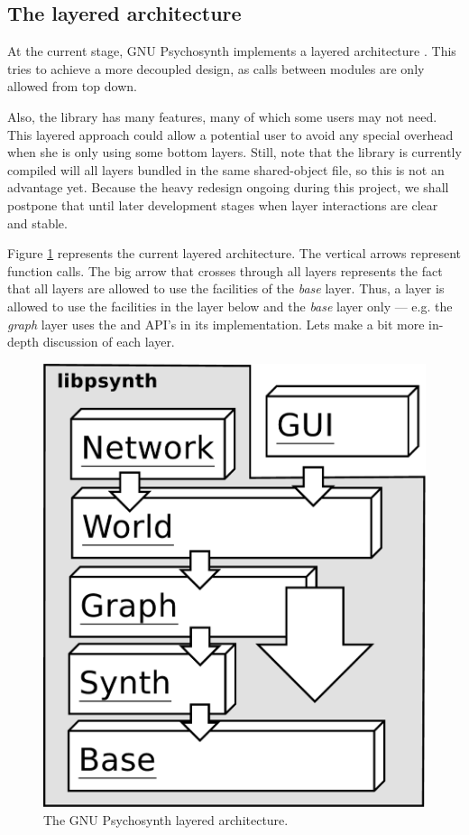 \subsection{The layered architecture}

At the current stage, GNU Psychosynth implements a layered
architecture \cite{garlan94software}. This
tries to achieve a more decoupled design, as calls between modules are
only allowed from top down.

Also, the library has many features, many of which some users may not
need. This layered approach could allow a potential user to avoid any
special overhead when she is only using some bottom layers. Still,
note that the library is currently compiled will all layers bundled in
the same shared-object file, so this is not an advantage yet. Because
the heavy redesign ongoing during this project, we shall postpone that
until later development stages when layer interactions are clear and
stable.

Figure \ref{fig:layers} represents the current layered
architecture. The vertical arrows represent function calls. The big
arrow that crosses through all layers represents the fact that all
layers are allowed to use the facilities of the \emph{base}
layer. Thus, a layer is allowed to use the facilities in the layer
below and the \emph{base} layer only --- e.g. the \emph{graph} layer
uses the  and  API's in its
implementation. Lets make a bit more in-depth discussion of each
layer.

\begin{figure}[h!]\centering
\includegraphics[width=.6\textwidth]{pic/layers.pdf}
\caption{The GNU Psychosynth layered architecture.}
\label{fig:layers}
\end{figure}

